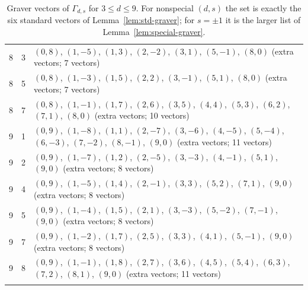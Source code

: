 \begin{longtable}{@{}rrp{9.2cm}@{}}
8 & 3 & $(0,8)$, $(1,-5)$, $(1,3)$, $(2,-2)$, $(3,1)$, $(5,-1)$, $(8,0)$ (extra vectors; 7 vectors)\\
8 & 5 & $(0,8)$, $(1,-3)$, $(1,5)$, $(2,2)$, $(3,-1)$, $(5,1)$, $(8,0)$ (extra vectors; 7 vectors)\\
8 & 7 & $(0,8)$, $(1,-1)$, $(1,7)$, $(2,6)$, $(3,5)$, $(4,4)$, $(5,3)$, $(6,2)$, $(7,1)$, $(8,0)$ (extra vectors; 10 vectors)\\
9 & 1 & $(0,9)$, $(1,-8)$, $(1,1)$, $(2,-7)$, $(3,-6)$, $(4,-5)$, $(5,-4)$, $(6,-3)$, $(7,-2)$, $(8,-1)$, $(9,0)$ (extra vectors; 11 vectors)\\
9 & 2 & $(0,9)$, $(1,-7)$, $(1,2)$, $(2,-5)$, $(3,-3)$, $(4,-1)$, $(5,1)$, $(9,0)$ (extra vectors; 8 vectors)\\
9 & 4 & $(0,9)$, $(1,-5)$, $(1,4)$, $(2,-1)$, $(3,3)$, $(5,2)$, $(7,1)$, $(9,0)$ (extra vectors; 8 vectors)\\
9 & 5 & $(0,9)$, $(1,-4)$, $(1,5)$, $(2,1)$, $(3,-3)$, $(5,-2)$, $(7,-1)$, $(9,0)$ (extra vectors; 8 vectors)\\
9 & 7 & $(0,9)$, $(1,-2)$, $(1,7)$, $(2,5)$, $(3,3)$, $(4,1)$, $(5,-1)$, $(9,0)$ (extra vectors; 8 vectors)\\
9 & 8 & $(0,9)$, $(1,-1)$, $(1,8)$, $(2,7)$, $(3,6)$, $(4,5)$, $(5,4)$, $(6,3)$, $(7,2)$, $(8,1)$, $(9,0)$ (extra vectors; 11 vectors)\\
\bottomrule\caption{Graver vectors of $\Gamma_{d,s}$ for $3\le d\le9$. For nonspecial $(d,s)$ the set is exactly the six standard vectors of Lemma~\ref{lem:std-graver}; for $s=\pm1$ it is the larger list of Lemma~\ref{lem:special-graver}.}\label{tab:graver}\end{longtable}